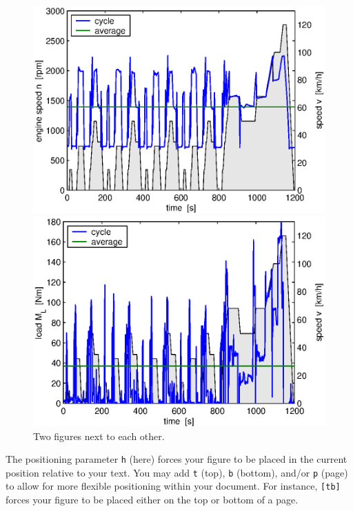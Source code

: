 \begin{figure}[ht]
  \begin{minipage}[t]{0.48\textwidth}
    \includegraphics[width = \textwidth]{img/cycle_we.eps}
  \end{minipage}
  \hfill
  \begin{minipage}[t]{0.48\textwidth}
    \includegraphics[width = \textwidth]{img/cycle_ml.eps}
  \end{minipage}
  \caption{Two figures next to each other.}
  \label{img:cycle}
\end{figure}

The positioning parameter \texttt{h} (here) forces your figure to be placed in the current position relative to your text. You may add \texttt{t} (top), \texttt{b} (bottom), and/or \texttt{p} (page) to allow for more flexible positioning within your document. For instance, \texttt{[tb]} forces your figure to be placed either on the top or bottom of a page.


